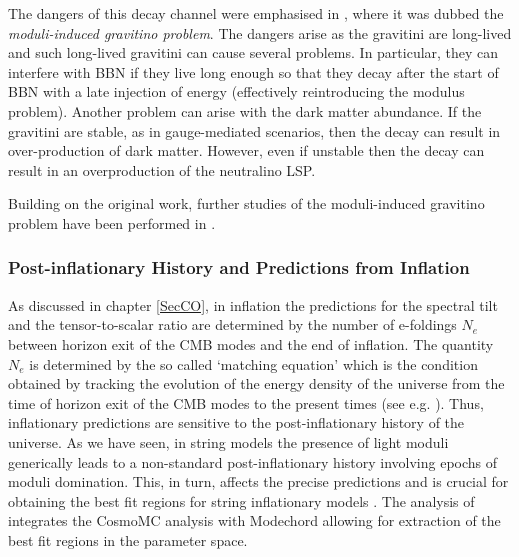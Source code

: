 The dangers of this decay channel were emphasised in \cite{hepph0602061, hepph0602081}, where it was dubbed the \emph{moduli-induced gravitino problem}. The dangers arise as the gravitini are long-lived and such long-lived gravitini can cause several problems. In particular, they can interfere with BBN if they live long enough so that they decay after the start of BBN with a late injection of energy (effectively reintroducing the modulus problem). Another problem can arise with the dark matter abundance. If the gravitini are stable, as in gauge-mediated scenarios, then the decay can result in over-production of dark matter. However, even if unstable then the decay can result in an overproduction of the neutralino LSP.

Building on the original work, further studies of the moduli-induced gravitino problem have been performed in \cite{hepph0603265, hepph0604140, hepph0604132, hepph0605297, hepph0607170, hepph0701042, hepph0703319, Heckman:2008jy, 09043773, 09082430, 12092583, 12104077, 13110052, 150402040, 160308399, 220106633}.

\subsubsection{Post-inflationary History and Predictions from Inflation}

As discussed in chapter \ref{SecCO}, in inflation the predictions for the spectral tilt and the tensor-to-scalar ratio are determined by the number of e-foldings $N_e$ between horizon exit of the CMB modes and the end of inflation. The quantity $N_e$ is determined by the so called `matching equation' which is the condition obtained by tracking the evolution of the energy density of the universe from the time of horizon exit of the CMB modes to the present times (see e.g. \cite{Planck:2013jfk}). Thus, inflationary predictions are sensitive to the post-inflationary history of the universe. As we have seen, in string models the presence of light moduli generically leads to a non-standard post-inflationary history involving epochs of moduli domination. This, in turn, affects the precise predictions and is crucial for obtaining the best fit regions for string inflationary models \cite{Easther:2013nga, Dutta:2014tya, Bhattacharya:2017ysa, Cicoli:2020bao, Bhattacharya:2020gnk, Neves:2020anh}. The analysis of \cite{Bhattacharya:2017ysa, Bhattacharya:2020gnk} integrates the CosmoMC analysis with Modechord \cite{Handley:2015fda} allowing for extraction of the best fit regions in the parameter space.



